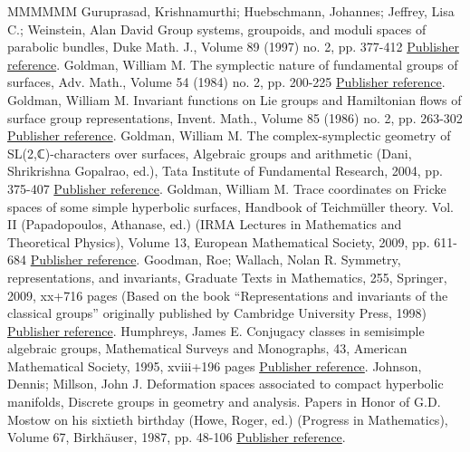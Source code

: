 \begin{thebibliography}{MMMMMM}
 Guruprasad, Krishnamurthi; Huebschmann, Johannes; Jeffrey, Lisa C.; Weinstein, Alan David Group systems, groupoids, and moduli spaces of parabolic bundles, Duke Math. J., Volume 89 (1997) no. 2, pp. 377-412 \href{https://ahl.centre-mersenne.org/item/AHL_2020__3__341_0/#GHJW}{Publisher reference}.
 Goldman, William M. The symplectic nature of fundamental groups of surfaces, Adv. Math., Volume 54 (1984) no. 2, pp. 200-225 \href{https://ahl.centre-mersenne.org/item/AHL_2020__3__341_0/#GoldmanAdvances}{Publisher reference}.
 Goldman, William M. Invariant functions on Lie groups and Hamiltonian flows of surface group representations, Invent. Math., Volume 85 (1986) no. 2, pp. 263-302 \href{https://ahl.centre-mersenne.org/item/AHL_2020__3__341_0/#GoldmanHamiltonian}{Publisher reference}.
 Goldman, William M. The complex-symplectic geometry of SL(2,ℂ)-characters over surfaces, Algebraic groups and arithmetic (Dani, Shrikrishna Gopalrao, ed.), Tata Institute of Fundamental Research, 2004, pp. 375-407 \href{https://ahl.centre-mersenne.org/item/AHL_2020__3__341_0/#GoldmanComplex}{Publisher reference}.
 Goldman, William M. Trace coordinates on Fricke spaces of some simple hyperbolic surfaces, Handbook of Teichmüller theory. Vol. II (Papadopoulos, Athanase, ed.) (IRMA Lectures in Mathematics and Theoretical Physics), Volume 13, European Mathematical Society, 2009, pp. 611-684 \href{https://ahl.centre-mersenne.org/item/AHL_2020__3__341_0/#Goldman09}{Publisher reference}.
 Goodman, Roe; Wallach, Nolan R. Symmetry, representations, and invariants, Graduate Texts in Mathematics, 255, Springer, 2009, xx+716 pages (Based on the book “Representations and invariants of the classical groups” originally published by Cambridge University Press, 1998) \href{https://ahl.centre-mersenne.org/item/AHL_2020__3__341_0/#GoodWall}{Publisher reference}.
 Humphreys, James E. Conjugacy classes in semisimple algebraic groups, Mathematical Surveys and Monographs, 43, American Mathematical Society, 1995, xviii+196 pages \href{https://ahl.centre-mersenne.org/item/AHL_2020__3__341_0/#Humphreys}{Publisher reference}.
 Johnson, Dennis; Millson, John J. Deformation spaces associated to compact hyperbolic manifolds, Discrete groups in geometry and analysis. Papers in Honor of G.D. Mostow on his sixtieth birthday (Howe, Roger, ed.) (Progress in Mathematics), Volume 67, Birkhäuser, 1987, pp. 48-106 \href{https://ahl.centre-mersenne.org/item/AHL_2020__3__341_0/#JohnsonMillson}{Publisher reference}.

\end{thebibliography}
